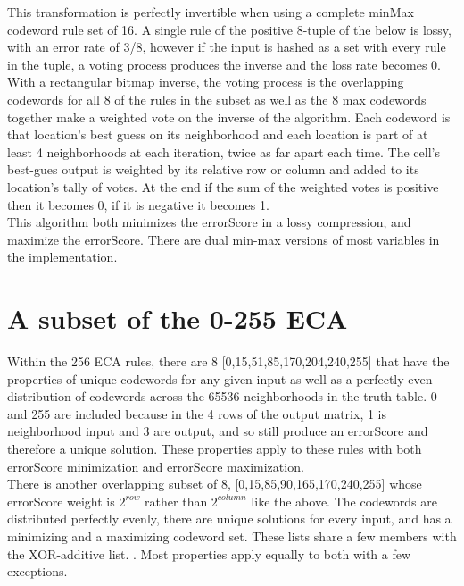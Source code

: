 \documentclass[11pt]{article}
\begin{document}
This transformation is perfectly invertible when using a complete minMax codeword rule set of 16. A single rule of the positive 8-tuple of the below is lossy, with an error rate of 3/8, however if the input is hashed as a set with every rule in the tuple, a voting process produces the inverse and the loss rate becomes 0. With a rectangular bitmap inverse, the voting process is the overlapping codewords for all 8 of the rules in the subset as well as the 8 max codewords together make a weighted vote on the inverse of the algorithm. Each codeword is that location's best guess on its neighborhood and each location is part of at least 4 neighborhoods at each iteration, twice as far apart each time. The cell's best-gues output is weighted by its relative row or column and added to its location's tally of votes. At the end if the sum of the weighted votes is positive then it becomes 0, if it is negative it becomes 1. \\

This algorithm both minimizes the errorScore in a lossy compression, and maximize the errorScore. There are dual min-max versions of most variables in the implementation. \\

\section{A subset of the 0-255 ECA}

Within the 256 ECA rules, there are 8 [0,15,51,85,170,204,240,255] that have the properties of unique codewords for any given input as well as a perfectly even distribution of codewords across the 65536 neighborhoods in the truth table. 0 and 255 are included because in the 4 rows of the output matrix, 1 is neighborhood input and 3 are output, and so still produce an errorScore and therefore a unique solution. These properties apply to these rules with both errorScore minimization and errorScore maximization. \\

There is another overlapping subset of 8, [0,15,85,90,165,170,240,255] whose errorScore weight is $2^{row}$ rather than $2^{column}$ like the above. The codewords are distributed perfectly evenly, there are unique solutions for every input, and has a minimizing and a maximizing codeword set. These lists share a few members with the XOR-additive list. \cite{xorAdditive}. Most properties apply equally to both with a few exceptions.\\
\end{document}
